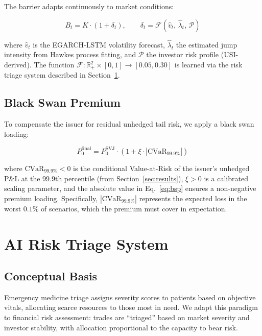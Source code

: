 \documentclass[12pt]{article}
\begin{document}
The barrier adapts continuously to market conditions:

\begin{equation}
    B_t = K \cdot (1 + \delta_t), \qquad \delta_t = \mathcal{F}(\hat{v}_t,\,\hat{\lambda}_t,\,\mathcal{P})
    \label{eq:barrier}
\end{equation}

where $\hat{v}_t$ is the EGARCH-LSTM volatility forecast, $\hat{\lambda}_t$ the estimated
jump intensity from Hawkes process fitting, and $\mathcal{P}$ the investor risk profile
(USI-derived). The function $\mathcal{F}: \mathbb{R}_+^2 \times [0,1] \to [0.05, 0.30]$
is learned via the risk triage system described in Section~\ref{sec:triage}.

\subsection{Black Swan Premium}

To compensate the issuer for residual unhedged tail risk, we apply a black swan loading:

\begin{equation}
    P_0^{\text{final}} = P_0^{\text{SVJ}} \cdot \left(1 + \xi \cdot \left|\text{CVaR}_{99.9\%}\right|\right)
    \label{eq:bsp}
\end{equation}

where $\text{CVaR}_{99.9\%} < 0$ is the conditional Value-at-Risk of the issuer's unhedged
P\&L at the 99.9th percentile (from Section~\ref{sec:results}), $\xi > 0$ is a calibrated
scaling parameter, and the absolute value in Eq.~\eqref{eq:bsp} ensures a non-negative
premium loading. Specifically, $|\text{CVaR}_{99.9\%}|$ represents the expected loss in the
worst $0.1\%$ of scenarios, which the premium must cover in expectation.

\section{AI Risk Triage System}\label{sec:triage}

\subsection{Conceptual Basis}

Emergency medicine triage assigns severity scores to patients based on objective vitals,
allocating scarce resources to those most in need. We adapt this paradigm to financial risk
assessment: trades are ``triaged'' based on market severity and investor stability, with
allocation proportional to the capacity to bear risk.
\end{document}
